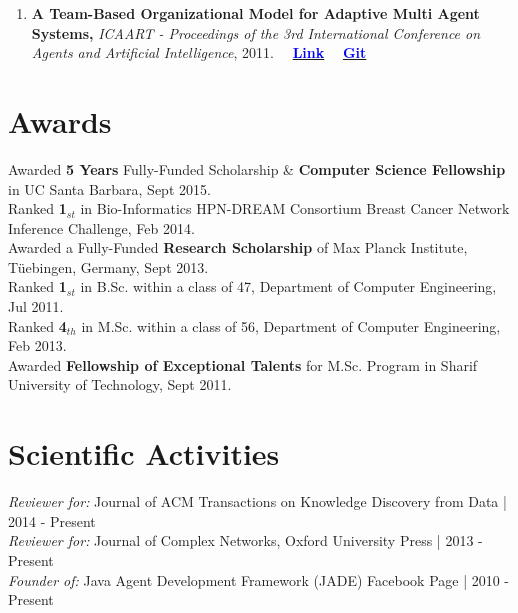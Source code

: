 \documentclass[letter]{res}
\begin{document}
\begin{resume}
\begin{enumerate}[leftmargin=-.01in]
			
			\item \textbf{A Team-Based Organizational Model for Adaptive Multi Agent Systems,} \textit{ICAART - Proceedings of the 3rd International Conference on Agents and Artificial Intelligence}, 2011.
			~~\href{https://www.researchgate.net/publication/221539731_A_Team-based_Organizational_Model_for_Adaptive_Multi-agent_Systems}{\textbf{\textcolor{blue}{Link}}}
			~~\href{https://github.com/omid55/team_based_rescue_jade_multi_agent_system}{\textbf{\textcolor{blue}{Git}}}
			
		\end{enumerate}
		
		
		\section{Awards}
		Awarded \textbf{5 Years} Fully-Funded Scholarship \& \textbf{Computer Science Fellowship} in UC Santa Barbara, Sept 2015.\\
		Ranked \textbf{1}$_{st}$ in Bio-Informatics HPN-DREAM Consortium Breast Cancer Network Inference Challenge, Feb 2014.\\
		Awarded a Fully-Funded \textbf{Research Scholarship} of Max Planck Institute, Tüebingen, Germany, Sept 2013.\\
		Ranked \textbf{1}$_{st}$ in B.Sc. within a class of 47, Department of Computer Engineering, Jul 2011.\\
		Ranked \textbf{4}$_{th}$ in M.Sc. within a class of 56, Department of Computer Engineering, Feb 2013.\\
		Awarded \textbf{Fellowship of Exceptional Talents} for M.Sc. Program in Sharif University of Technology, Sept 2011.
		
		
		\section{Scientific Activities}
		{\sl Reviewer for:  }Journal of ACM Transactions on Knowledge Discovery from Data | 2014 - Present\\
		{\sl Reviewer for:  }Journal of Complex Networks, Oxford University Press | 2013 - Present\\
		{\sl Founder of:  }Java Agent Development Framework (JADE) Facebook Page | 2010 - Present
		

\end{resume}
\end{document}

